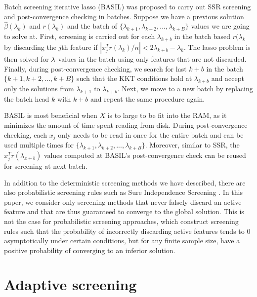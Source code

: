 Batch screening iterative lasso (BASIL) \citep{qian2019fast} was proposed to carry out SSR screening and post-convergence checking in batches. Suppose we have a previous solution $\hat{\beta}(\lambda_k)$ and $r(\lambda_k)$ and the batch of $\{\lambda_{k+1},\lambda_{k+2},...,\lambda_{k+B}\}$ values we are going to solve at. First, screening is carried out for each $\lambda_{k+b}$ in the batch based $r(\lambda_k$ by discarding the $j$th feature if $|x_j^Tr(\lambda_k)/n|<2\lambda_{k+b}-\lambda_k$. The lasso problem is then solved for $\lambda$ values in the batch using only features that are not discarded. Finally, during post-convergence checking, we search for last $k+b$ in the batch $\{k+1,k+2,...,k+B\}$ such that the KKT conditions hold at $\lambda_{k+b}$ and accept only the solutions from $\lambda_{k+1}$ to $\lambda_{k+b}$. Next, we move to a new batch by replacing the batch head $k$ with $k+b$ and repeat the same procedure again.

BASIL is most beneficial when $X$ is to large to be fit into the RAM, as it minimizes the amount of time spent reading from disk. During post-convergence checking, each $x_j$ only needs to be read in once for the entire batch and can be used multiple times for $\{\lambda_{k+1},\lambda_{k+2},...,\lambda_{k+B}\}$. Moreover, similar to SSR, the $x_j^Tr(\lambda_{x+b})$ values computed at BASIL's post-convergence check can be reused for screening at next batch.

In addition to the deterministic screening methods we have described, there are also probabilistic screening rules such as Sure Independence Screening \citep{Fan2008}. In this paper, we consider only screening methods that never falsely discard an active feature and that are thus guaranteed to converge to the global solution. This is not the case for probabilistic screening approaches, which construct screening rules such that the probability of incorrectly discarding active features tends to 0 asymptotically under certain conditions, but for any finite sample size, have a positive probability of converging to an inferior solution.

\section{Adaptive screening}
\label{sec:method}


